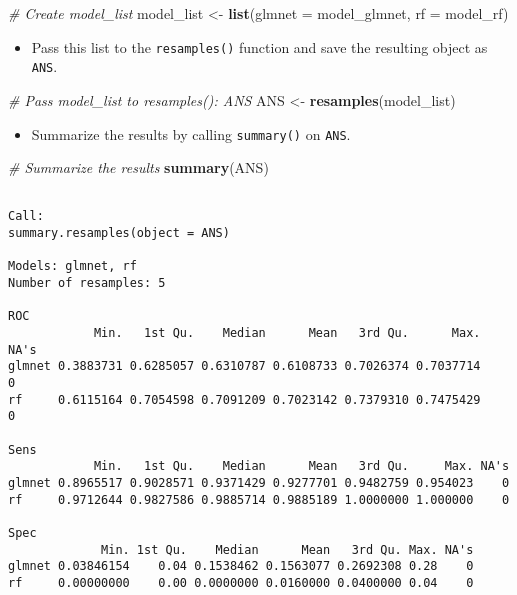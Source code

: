 \documentclass[
]{book}
\newenvironment{Shaded}{\begin{snugshade}}{\end{snugshade}}
\newcommand{\CommentTok}[1]{\textcolor[rgb]{0.56,0.35,0.01}{\textit{#1}}}
\newcommand{\DataTypeTok}[1]{\textcolor[rgb]{0.13,0.29,0.53}{#1}}
\newcommand{\KeywordTok}[1]{\textcolor[rgb]{0.13,0.29,0.53}{\textbf{#1}}}
\newcommand{\NormalTok}[1]{#1}
\newcommand{\StringTok}[1]{\textcolor[rgb]{0.31,0.60,0.02}{#1}}
\providecommand{\tightlist}{%
  \setlength{\itemsep}{0pt}\setlength{\parskip}{0pt}}
\begin{document}
\begin{Shaded}
\begin{Highlighting}[]
\CommentTok{# Create model_list}
\NormalTok{model_list <-}\StringTok{ }\KeywordTok{list}\NormalTok{(}\DataTypeTok{glmnet =}\NormalTok{ model_glmnet, }\DataTypeTok{rf =}\NormalTok{ model_rf)}
\end{Highlighting}
\end{Shaded}

\begin{itemize}
\tightlist
\item
  Pass this list to the \texttt{resamples()} function and save the resulting object as \texttt{ANS}.
\end{itemize}

\begin{Shaded}
\begin{Highlighting}[]
\CommentTok{# Pass model_list to resamples(): ANS}
\NormalTok{ANS <-}\StringTok{ }\KeywordTok{resamples}\NormalTok{(model_list)}
\end{Highlighting}
\end{Shaded}

\begin{itemize}
\tightlist
\item
  Summarize the results by calling \texttt{summary()} on \texttt{ANS}.
\end{itemize}

\begin{Shaded}
\begin{Highlighting}[]
\CommentTok{# Summarize the results}
\KeywordTok{summary}\NormalTok{(ANS)}
\end{Highlighting}
\end{Shaded}

\begin{verbatim}

Call:
summary.resamples(object = ANS)

Models: glmnet, rf 
Number of resamples: 5 

ROC 
            Min.   1st Qu.    Median      Mean   3rd Qu.      Max. NA's
glmnet 0.3883731 0.6285057 0.6310787 0.6108733 0.7026374 0.7037714    0
rf     0.6115164 0.7054598 0.7091209 0.7023142 0.7379310 0.7475429    0

Sens 
            Min.   1st Qu.    Median      Mean   3rd Qu.     Max. NA's
glmnet 0.8965517 0.9028571 0.9371429 0.9277701 0.9482759 0.954023    0
rf     0.9712644 0.9827586 0.9885714 0.9885189 1.0000000 1.000000    0

Spec 
             Min. 1st Qu.    Median      Mean   3rd Qu. Max. NA's
glmnet 0.03846154    0.04 0.1538462 0.1563077 0.2692308 0.28    0
rf     0.00000000    0.00 0.0000000 0.0160000 0.0400000 0.04    0
\end{verbatim}
\end{document}
